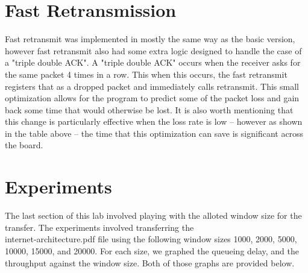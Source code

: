 \documentclass[a4paper,11pt]{article}
\begin{document}
\section*{Fast Retransmission}
Fast retransmit was implemented in mostly the same way as the basic version, however fast retransmit also had some extra logic designed to handle the case of a "triple double ACK". A "triple double ACK" occurs when the receiver asks for the same packet 4 times in a row. This when this occurs, the fast retransmit registers that as a dropped packet and immediately calls retransmit. This small optimization allows for the program to predict some of the packet loss and gain back some time that would otherwise be lost. It is also worth mentioning that this change is particularly effective when the loss rate is low -- however as shown in the table above -- the time that this optimization can save is significant across the board.

\section*{Experiments}
The last section of this lab involved playing with the alloted window size for the transfer. The experiments involved transferring the\\ internet-architecture.pdf file using the following window sizes 1000, 2000, 5000, 10000, 15000, and 20000. For each size, we graphed the queueing delay, and the throughput against the window size. Both of those graphs are provided below. 
\end{document}
